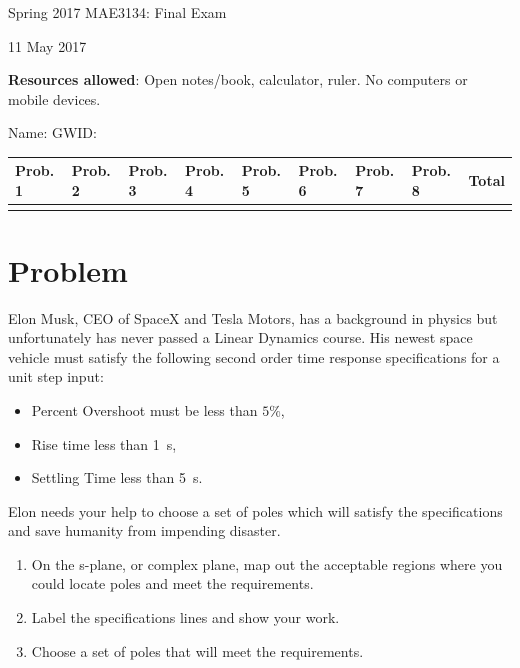 \documentclass[titlepage, 11pt, reqno]{article}    %
\begin{document}
\begin{titlepage}
    \centering
    \vspace{1cm}
    {\Large Spring 2017 MAE3134: Final Exam\par }
    \vspace{3cm}
    {11 May 2017\par}
    \vspace{1cm}
    \textbf{Resources allowed}: Open notes/book, calculator, ruler. 
    No computers or mobile devices.

    \vspace{1cm}
    {Name: \underline{\hspace{5cm}} \hspace{2cm} GWID:\underline{\hspace{5cm}}\par}
    \vspace{3cm}

    \begin{tabular}{|l|l|l|l|l|l|l|l|l|}
        \hline
        Prob. 1 & Prob. 2 & Prob. 3 & Prob. 4 & Prob. 5 & Prob. 6 & Prob. 7 & Prob. 8 & Total \\
        \hline
        & & & & & & & &\\[4ex]
        \hline
    \end{tabular}
    \vfill
\end{titlepage}
\section{Problem}\label{prob:sys_response_to_poles}
Elon Musk, CEO of SpaceX and Tesla Motors, has a background in physics but unfortunately has never passed a Linear Dynamics course. 
His newest space vehicle must satisfy the following second order time response specifications for a unit step input:
\begin{itemize}
    \item Percent Overshoot must be less than \(5 \%\),
    \item Rise time less than \SI{1}{\second},
    \item Settling Time less than \SI{5}{\second}.
\end{itemize}
Elon needs your help to choose a set of poles which will satisfy the specifications and save humanity from impending disaster.
\begin{enumerate}
    \item On the s-plane, or complex plane, map out the acceptable regions where you could locate poles and meet the requirements. 
    \item Label the specifications lines and show your work.
    \item Choose a set of poles that will meet the requirements.
\end{enumerate}
\end{document}
